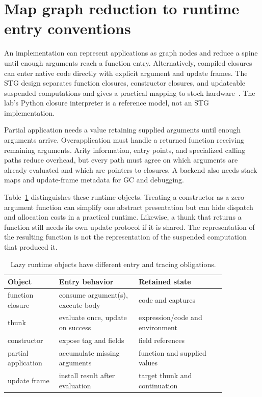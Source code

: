 \section{Map graph reduction to runtime entry conventions}
\label{sec:ch92-entry}
An implementation can represent applications as graph nodes and reduce a spine until enough arguments reach a function entry.
Alternatively, compiled closures can enter native code directly with explicit argument and update frames.
The STG design separates function closures, constructor closures, and updateable suspended computations and gives a practical mapping to stock hardware~\cite{peytonjones-1992-stg}.
The lab's Python closure interpreter is a reference model, not an STG implementation.

Partial application needs a value retaining supplied arguments until enough arguments arrive.
Overapplication must handle a returned function receiving remaining arguments.
Arity information, entry points, and specialized calling paths reduce overhead, but every path must agree on which arguments are already evaluated and which are pointers to closures.
A backend also needs stack maps and update-frame metadata for GC and debugging.

Table~\ref{tab:ch92-runtime} distinguishes these runtime objects.
Treating a constructor as a zero-argument function can simplify one abstract presentation but can hide dispatch and allocation costs in a practical runtime.
Likewise, a thunk that returns a function still needs its own update protocol if it is shared.
The representation of the resulting function is not the representation of the suspended computation that produced it.

\begin{table}[htbp]
\caption{Lazy runtime objects have different entry and tracing obligations.}
\label{tab:ch92-runtime}
\centering
\begin{tabular}{p{0.20\linewidth}p{0.31\linewidth}p{0.34\linewidth}}
\toprule
Object & Entry behavior & Retained state \\
\midrule
function closure & consume argument(s), execute body & code and captures \\
thunk & evaluate once, update on success & expression/code and environment \\
constructor & expose tag and fields & field references \\
partial application & accumulate missing arguments & function and supplied values \\
update frame & install result after evaluation & target thunk and continuation \\
\bottomrule
\end{tabular}
\end{table}

